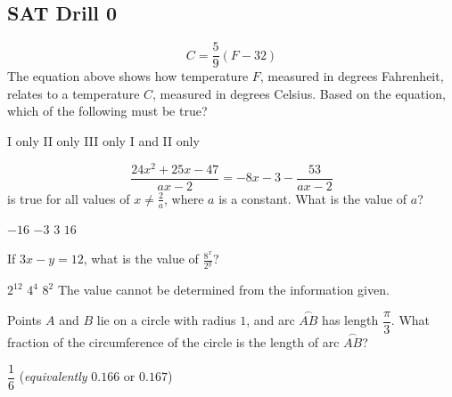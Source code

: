
\subsection*{SAT Drill 0}


\question[1]
\[
  C = \frac{5}{9}(F - 32)
\]
The equation above shows how temperature $F$, measured in degrees Fahrenheit, relates to a temperature $C$, measured in degrees Celsius. Based on the equation, which of the following must be true?


\begin{choices}
  \choice I only
  \choice II only
  \choice III only
  \CorrectChoice I and II only
\end{choices}

\question[1]
\[
  \frac{24x^2 + 25x - 47}{ax - 2} = -8x - 3 - \frac{53}{ax - 2}
\]
is true for all values of $x \neq \frac{2}{a}$, where $a$ is a constant. What is the value of $a$?

\begin{choices}
  \choice $-16$
  \CorrectChoice $-3$
  \choice $3$
  \choice $16$
\end{choices}


\newpage



\question[1]
If $3x - y = 12$, what is the value of $\displaystyle \frac{8^x}{2^y}$?

\begin{choices}
  \CorrectChoice $2^{12}$
  \choice $4^4$
  \choice $8^2$
  \choice The value cannot be determined from the information given.
\end{choices}

\question[1]
Points $A$ and $B$ lie on a circle with radius $1$, and arc $\stackrel{\frown}{AB}$ has length $\dfrac{\pi}{3}$. What fraction of the circumference of the circle is the length of arc $\stackrel{\frown}{AB}$?
\begin{solution}
$\dfrac{1}{6}$ \quad (\textit{equivalently} $0.166$ or $0.167$)
\end{solution}

